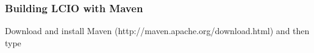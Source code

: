 \documentclass[twoside]{article}
\begin{document}
%
%
%
%

\subsubsection{Building LCIO with Maven}
Download and install Maven (http://maven.apache.org/download.html) and then type
\end{document}
